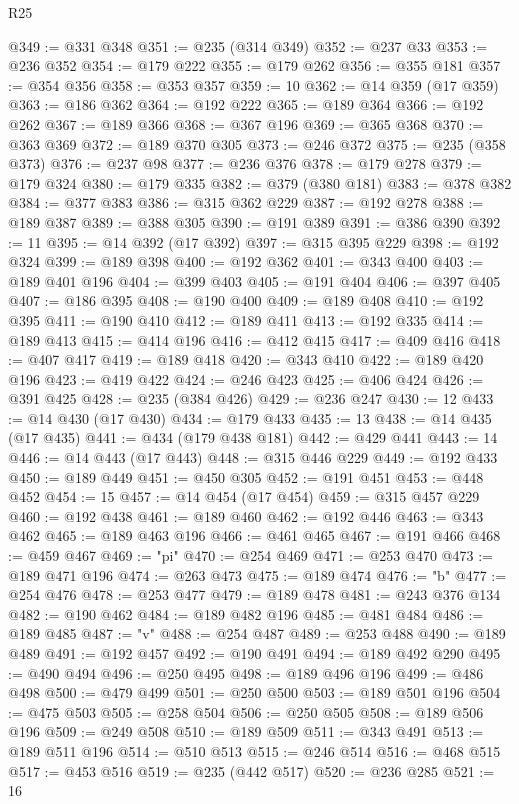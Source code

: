\begin{lexlean}{R25}
\begin{coremodule}
@349 := @331 @348
@351 := @235 (@314 @349)
@352 := @237 @33
@353 := @236 @352
@354 := @179 @222
@355 := @179 @262
@356 := @355 @181
@357 := @354 @356
@358 := @353 @357
@359 := 10
@362 := @14 @359 (@17 @359)
@363 := @186 @362
@364 := @192 @222
@365 := @189 @364
@366 := @192 @262
@367 := @189 @366
@368 := @367 @196
@369 := @365 @368
@370 := @363 @369
@372 := @189 @370 @305
@373 := @246 @372
@375 := @235 (@358 @373)
@376 := @237 @98
@377 := @236 @376
@378 := @179 @278
@379 := @179 @324
@380 := @179 @335
@382 := @379 (@380 @181)
@383 := @378 @382
@384 := @377 @383
@386 := @315 @362 @229
@387 := @192 @278
@388 := @189 @387
@389 := @388 @305
@390 := @191 @389
@391 := @386 @390
@392 := 11
@395 := @14 @392 (@17 @392)
@397 := @315 @395 @229
@398 := @192 @324
@399 := @189 @398
@400 := @192 @362
@401 := @343 @400
@403 := @189 @401 @196
@404 := @399 @403
@405 := @191 @404
@406 := @397 @405
@407 := @186 @395
@408 := @190 @400
@409 := @189 @408
@410 := @192 @395
@411 := @190 @410
@412 := @189 @411
@413 := @192 @335
@414 := @189 @413
@415 := @414 @196
@416 := @412 @415
@417 := @409 @416
@418 := @407 @417
@419 := @189 @418
@420 := @343 @410
@422 := @189 @420 @196
@423 := @419 @422
@424 := @246 @423
@425 := @406 @424
@426 := @391 @425
@428 := @235 (@384 @426)
@429 := @236 @247
@430 := 12
@433 := @14 @430 (@17 @430)
@434 := @179 @433
@435 := 13
@438 := @14 @435 (@17 @435)
@441 := @434 (@179 @438 @181)
@442 := @429 @441
@443 := 14
@446 := @14 @443 (@17 @443)
@448 := @315 @446 @229
@449 := @192 @433
@450 := @189 @449
@451 := @450 @305
@452 := @191 @451
@453 := @448 @452
@454 := 15
@457 := @14 @454 (@17 @454)
@459 := @315 @457 @229
@460 := @192 @438
@461 := @189 @460
@462 := @192 @446
@463 := @343 @462
@465 := @189 @463 @196
@466 := @461 @465
@467 := @191 @466
@468 := @459 @467
@469 := "pi"
@470 := @254 @469
@471 := @253 @470
@473 := @189 @471 @196
@474 := @263 @473
@475 := @189 @474
@476 := "b"
@477 := @254 @476
@478 := @253 @477
@479 := @189 @478
@481 := @243 @376 @134
@482 := @190 @462
@484 := @189 @482 @196
@485 := @481 @484
@486 := @189 @485
@487 := "v"
@488 := @254 @487
@489 := @253 @488
@490 := @189 @489
@491 := @192 @457
@492 := @190 @491
@494 := @189 @492 @290
@495 := @490 @494
@496 := @250 @495
@498 := @189 @496 @196
@499 := @486 @498
@500 := @479 @499
@501 := @250 @500
@503 := @189 @501 @196
@504 := @475 @503
@505 := @258 @504
@506 := @250 @505
@508 := @189 @506 @196
@509 := @249 @508
@510 := @189 @509
@511 := @343 @491
@513 := @189 @511 @196
@514 := @510 @513
@515 := @246 @514
@516 := @468 @515
@517 := @453 @516
@519 := @235 (@442 @517)
@520 := @236 @285
@521 := 16

\end{coremodule}
\end{lexlean}
